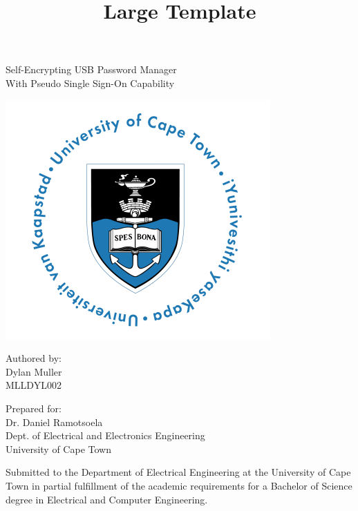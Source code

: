 \title{Large Template}

\begin{titlepage}
{\Huge \begin{center}
Self-Encrypting USB Password Manager\\
{\Large With Pseudo Single Sign-On Capability}
\end{center}}

\vskip 5mm
\begin{center}
\includegraphics[scale = 0.7]{Figures/UCT.jpg}
\end{center}

\vskip 5mm
\begin{center}
Authored by:\\
Dylan Muller\\
MLLDYL002
\end{center}

\vskip 10mm
\begin{center}
Prepared for:\\
Dr. Daniel Ramotsoela\\
Dept. of Electrical and Electronics Engineering\\University of Cape Town
\end{center}

\vskip 10mm
\begin{center}
Submitted to the Department of Electrical Engineering at the University of Cape Town in partial
fulfillment of the academic requirements for a Bachelor of Science degree in Electrical and Computer Engineering.
\end{center}

\vskip 5mm

\end{titlepage}